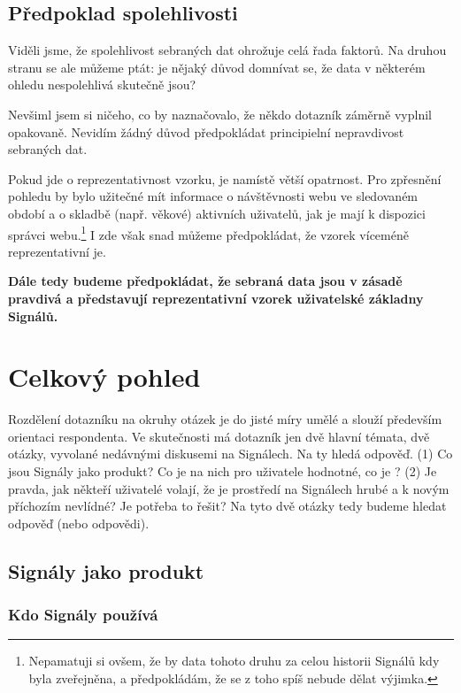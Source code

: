\documentclass[12pt, a4paper, twoside]{article}
\begin{document}
\subsection{Předpoklad spolehlivosti}

Viděli jsme, že spolehlivost sebraných dat ohrožuje celá řada
faktorů. Na druhou stranu se ale můžeme ptát:
je nějaký důvod domnívat se, že data v některém ohledu nespolehlivá
skutečně jsou?

Nevšiml jsem si ničeho, co by naznačovalo, že někdo dotazník
záměrně vyplnil opakovaně. Nevidím žádný důvod předpokládat
principielní nepravdivost sebraných dat.

Pokud jde o reprezentativnost vzorku, je namístě větší opatrnost.
Pro zpřesnění pohledu by bylo užitečné mít informace
o návštěvnosti webu ve sledovaném období a o skladbě (např. věkové)
aktivních uživatelů, jak je mají k dispozici
správci webu.\footnote{
  Nepamatuji si ovšem, že by data tohoto druhu za celou historii
  Signálů kdy byla zveřejněna, a předpokládám, že se z toho
  spíš nebude dělat výjimka.
}
I zde však snad můžeme předpokládat, že vzorek víceméně
reprezentativní je.

\textbf{Dále tedy budeme předpokládat, že sebraná data jsou v zásadě
pravdivá a představují reprezentativní vzorek uživatelské základny
Signálů.}

\section{Celkový pohled}

Rozdělení dotazníku na okruhy otázek je do jisté míry umělé
a slouží především orientaci respondenta.
Ve skutečnosti má dotazník jen dvě hlavní témata,
dvě otázky, vyvolané nedávnými diskusemi na Signálech.
Na ty hledá odpověď. (1) Co jsou Signály jako produkt?
Co je na nich pro uživatele hodnotné, co je ?
(2) Je pravda, jak někteří uživatelé volají, že je prostředí
na Signálech hrubé a k novým příchozím nevlídné?
Je potřeba to řešit?
Na tyto dvě otázky tedy budeme hledat odpověď (nebo odpovědi).

\subsection{Signály jako produkt}

\subsubsection{Kdo Signály používá}
\end{document}
